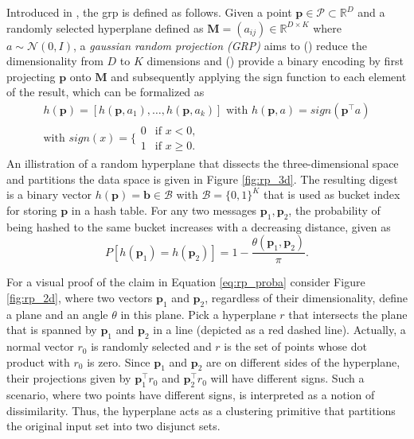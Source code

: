 \documentclass[../../../main.tex]{subfiles}
\begin{document}
Introduced in \cite{charikar2002similarity}, the \gls{grp} is defined as follows. Given a point $\bm{p} \in \mathcal{P} \subset \mathbb{R}^D$ and a randomly selected hyperplane defined as $\bm{M}=(a_{ij}) \in \mathbb{R}^{D \times K}$ where $a \sim \mathcal{N}(0, I)$, a \textit{gaussian random projection (GRP)} aims to () reduce the dimensionality from $D$ to $K$ dimensions and () provide a binary encoding by first projecting $\bm{p}$ onto $\bm{M}$ and subsequently applying the sign function to each element of the result, which can be formalized as
\begin{gather}\label{eq:grp_sign}
    h(\bm{p}) = [h(\bm{p}, a_1), \dots, h(\bm{p}, a_k)] \text{ with } h(\bm{p}, a) = sign(\bm{p}^\top a) \\
    \text{with } sign(x) = \Biggl\{ \begin{array}{lc}
        0 & \text{if } x < 0, \\
        1 & \text{if } x \geq 0.
    \end{array}
\end{gather}
An illistration of a random hyperplane that dissects the three-dimensional space and partitions the data space is given in Figure \ref{fig:rp_3d}. The resulting digest is a binary vector $h(\bm{p}) = \bm{b} \in \mathcal{B}$ with $\mathcal{B} = \{0, 1\}^K$ that is used as bucket index for storing $\bm{p}$ in a hash table. For any two messages $\bm{p}_1, \bm{p}_2$, the probability of being hashed to the same bucket increases with a decreasing distance, given as
\begin{equation}\label{eq:rp_proba}
    P[h(\bm{p}_1) = h(\bm{p}_2)] = 1 - \frac{\theta(\bm{p}_1, \bm{p}_2)}{\pi}.
\end{equation}

For a visual proof of the claim in Equation \ref{eq:rp_proba} consider Figure \ref{fig:rp_2d}, where two vectors $\bm{p}_1$ and $\bm{p}_2$, regardless of their dimensionality, define a plane and an angle $\theta$ in this plane. Pick a hyperplane $r$ that intersects the plane that is spanned by $\bm{p}_1$ and $\bm{p}_2$ in a line (depicted as a red dashed line). Actually, a normal vector $r_0$ is randomly selected and $r$ is the set of points whose dot product with $r_0$ is zero. Since $\bm{p}_1$ and $\bm{p}_2$ are on different sides of the hyperplane, their projections given by $\bm{p}_1^\top r_0$ and  $\bm{p}_2^\top r_0$ will have different signs. Such a scenario, where two points have different signs, is interpreted as a notion of dissimilarity. Thus, the hyperplane acts as a clustering primitive that partitions the original input set into two disjunct sets.
\end{document}
